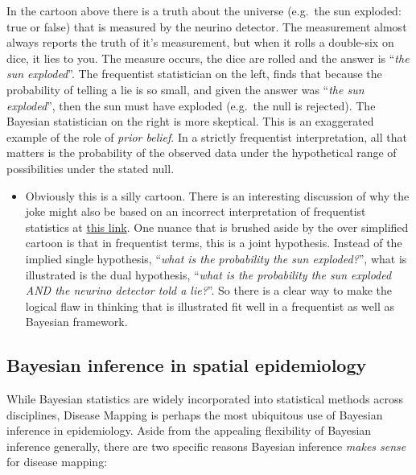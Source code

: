 \documentclass[
]{book}
\newenvironment{rmdblock}[1]
  {%
  \begin{itemize}
  \renewcommand{\labelitemi}{
    \raisebox{-.7\height}[0pt][0pt]{
      {\setkeys{Gin}{width=3em,keepaspectratio}\texttt{[image: images/\#1]}}
    }
  }
  \item
  }
  {
  \end{itemize}
  }
\newenvironment{rmdnote}
  {\begin{rmdblock}{note}}
  {\end{rmdblock}}
\begin{document}
In the cartoon above there is a truth about the universe (e.g.~the sun exploded: true or false) that is measured by the neurino detector. The measurement almost always reports the truth of it's measurement, but when it rolls a double-six on dice, it lies to you. The measure occurs, the dice are rolled and the answer is ``\emph{the sun exploded}''. The frequentist statistician on the left, finds that because the probability of telling a lie is so small, and given the answer was ``\emph{the sun exploded}'', then the sun must have exploded (e.g.~the null is rejected). The Bayesian statistician on the right is more skeptical. This is an exaggerated example of the role of \emph{prior belief}. In a strictly frequentist interpretation, all that matters is the probability of the observed data under the hypothetical range of possibilities under the stated null.

\begin{rmdnote}
Obviously this is a silly cartoon. There is an interesting discussion of why the joke might also be based on an incorrect interpretation of frequentist statistics at \href{https://statmodeling.stat.columbia.edu/2012/11/10/16808/}{this link}. One nuance that is brushed aside by the over simplified cartoon is that in frequentist terms, this is a joint hypothesis. Instead of the implied single hypothesis, ``\emph{what is the probability the sun exploded?}'', what is illustrated is the dual hypothesis, ``\emph{what is the probability the sun exploded AND the neurino detector told a lie?}''. So there is a clear way to make the logical flaw in thinking that is illustrated fit well in a frequentist as well as Bayesian framework.
\end{rmdnote}

\hypertarget{bayesian-inference-in-spatial-epidemiology}{%
\subsection{Bayesian inference in spatial epidemiology}\label{bayesian-inference-in-spatial-epidemiology}}

While Bayesian statistics are widely incorporated into statistical methods across disciplines, Disease Mapping is perhaps the most ubiquitous use of Bayesian inference in epidemiology. Aside from the appealing flexibility of Bayesian inference generally, there are two specific reasons Bayesian inference \emph{makes sense} for disease mapping:
\end{document}
